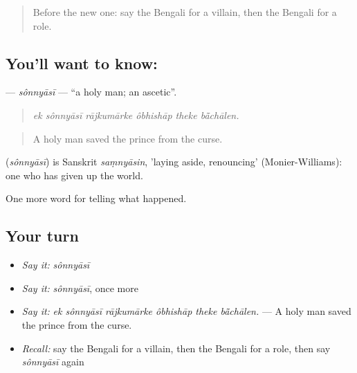 \label{lesson:BN-C323-sonnyasi}



\begin{quote}
Before the new one: say the Bengali for a villain, then the Bengali for a role.
\end{quote}

\subsection*{You'll want to know: }
\textbf{} — \emph{sônnyāsī} — \textquotedblleft{}a holy man; an ascetic\textquotedblright{}.

\begin{quote}
     
\end{quote}

\begin{quote}
\emph{ek sônnyāsī rājkumārke ôbhishāp theke bā̃chālen.}
\end{quote}

\begin{quote}
A holy man saved the prince from the curse.
\end{quote}

\begin{cousinweb}
\textbf{} (\emph{sônnyāsī}) is Sanskrit \emph{saṃnyāsin}, 'laying aside, renouncing' (Monier-Williams): one who has given up the world.
\end{cousinweb}

\begin{grammarlens}[title={What you've built}]
One more word for telling what happened.
\end{grammarlens}

\subsection*{Your turn}
\begin{itemize}
\raggedright
  \item \emph{Say it:} \emph{sônnyāsī}
  \item \emph{Say it:} \emph{sônnyāsī}, once more
  \item \emph{Say it:} \emph{ek sônnyāsī rājkumārke ôbhishāp theke bā̃chālen.} — A holy man saved the prince from the curse.
  \item \emph{Recall:} say the Bengali for a villain, then the Bengali for a role, then say \emph{sônnyāsī} again
\end{itemize}

